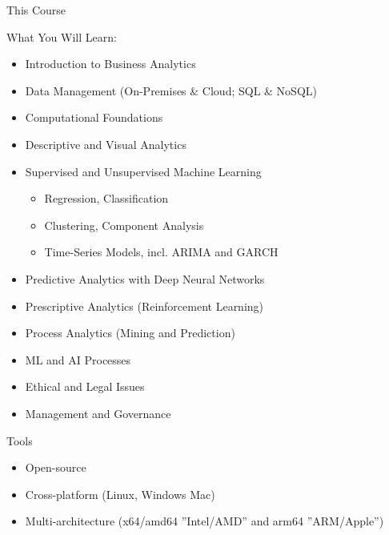 \documentclass[ignorenonframetext,xcolor=dvipsnames]{beamer}
\begin{document}
\begin{frame}{This Course}

\footnotesize

\begin{block}{What You Will Learn:}
\begin{itemize}
  \item Introduction to Business Analytics
  \item Data Management (On-Premises \& Cloud; SQL \& NoSQL)
  \item Computational Foundations
  \item Descriptive and Visual Analytics
  \item Supervised and Unsupervised Machine Learning 
  \begin{itemize}
    \footnotesize
    \item Regression, Classification
    \item Clustering, Component Analysis
    \item Time-Series Models, incl. ARIMA and GARCH
  \end{itemize}
  \item Predictive Analytics with Deep Neural Networks
  \item Prescriptive Analytics (Reinforcement Learning)
  \item Process Analytics (Mining and Prediction)
  \item ML and AI Processes
  \item Ethical and Legal Issues
  \item Management and Governance
\end{itemize}
\end{block}
\end{frame}

\begin{frame}{Tools}

\begin{itemize}
  \item Open-source
  \item Cross-platform (Linux, Windows Mac)
  \item Multi-architecture (x64/amd64 ''Intel/AMD'' and arm64 ''ARM/Apple'')
\end{itemize}
\end{frame}
\end{document}
